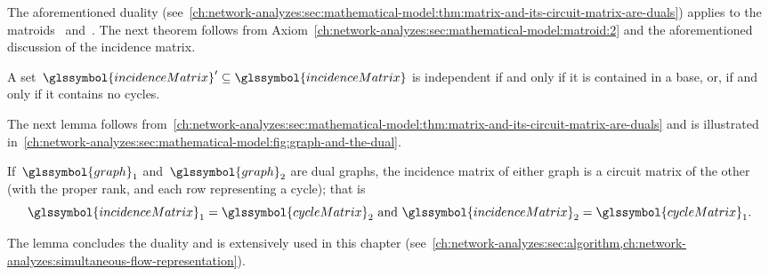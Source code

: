 The aforementioned duality
(see~\cref{ch:network-analyzes:sec:mathematical-model:thm:matrix-and-its-circuit-matrix-are-duals})
applies to the matroids~ and~.
% 
%
The next theorem follows from
Axiom~\ref{ch:network-analyzes:sec:mathematical-model:matroid:2} and the
aforementioned discussion of the incidence matrix.
%
\begin{theorem}
    A set~$\glssymbol{incidenceMatrix}'\subseteq\glssymbol{incidenceMatrix}$
    is independent if and only if it is contained in a base, or, if and only if
    it contains no cycles.
\label{ch:network-analyzes:sec:mathematical-model:thm:basis-contain-no-cylces}
\end{theorem}
% 
The next lemma follows
from~\cref{ch:network-analyzes:sec:mathematical-model:thm:matrix-and-its-circuit-matrix-are-duals}
and is illustrated
in~\cref{ch:network-analyzes:sec:mathematical-model:fig:graph-and-the-dual}.
%
\begin{lemma}
    If~$\glssymbol{graph}_1$ and~$\glssymbol{graph}_2$ are dual graphs, the
    incidence matrix of either
    graph is a circuit matrix of the other (with the proper rank, and each row
    representing a cycle); that is
    $$ \glssymbol{incidenceMatrix}_1 = \glssymbol{cycleMatrix}_2\text{ and }
    \glssymbol{incidenceMatrix}_2 = \glssymbol{cycleMatrix}_1.$$
    \label{ch:network-analyzes:sec:mathematical-model:cor:incidence-circuit-matrix-duals}
\end{lemma}
%
The lemma concludes the duality and is extensively used in this chapter
(see~\cref{ch:network-analyzes:sec:algorithm,ch:network-analyzes:simultaneous-flow-representation}).
% 
%
% 
